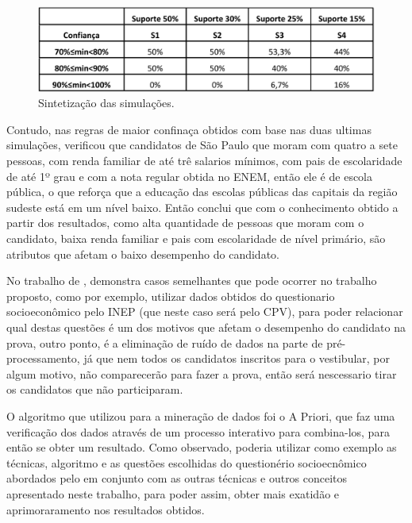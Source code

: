 \begin{figure}[!htp]
	\begin{center}
    \caption{\label{fig:waveform_fig} Sintetização das simulações.}
	\includegraphics[scale=0.49]{Figuras/Sintetizacao_simulacoes.png}
	\end{center}
\end{figure}

\par
Contudo, nas regras de maior confinaça obtidos com base nas duas ultimas simulações,  verificou que candidatos de São Paulo que moram com quatro a sete pessoas, com renda familiar de até trê salarios mínimos, com pais de escolaridade de até 1º grau e com a nota regular obtida no ENEM, então ele é de escola pública, o que reforça que a educação das escolas públicas das capitais da região sudeste está em um nível baixo. Então  conclui que com o conhecimento obtido a partir dos resultados, como alta quantidade de pessoas que moram com o candidato, baixa renda familiar e pais com escolaridade de nível primário, são atributos que afetam o baixo desempenho do candidato. 

No trabalho de , demonstra casos semelhantes que pode ocorrer no trabalho proposto, como por exemplo, utilizar dados obtidos do questionario socioeconômico pelo INEP (que neste caso será pelo CPV), para poder relacionar qual destas questões é um dos motivos que afetam o desempenho do candidato na prova, outro ponto, é a eliminação de ruído de dados na parte de pré-processamento, já que nem todos os candidatos inscritos para o vestibular, por algum motivo, não comparecerão para fazer a prova, então será nescessario tirar os candidatos que não participaram.

\par
O algoritmo que  utilizou para a mineração de dados foi o A Priori, que faz uma verificação dos dados através de um processo interativo para combina-los, para então se obter um resultado. Como observado, poderia utilizar como exemplo as técnicas, algoritmo e as questões escolhidas do questionério socioecnômico abordados pelo  em conjunto com as outras técnicas e outros conceitos apresentado neste trabalho, para poder assim, obter mais exatidão e aprimoraramento nos resultados obtidos.

